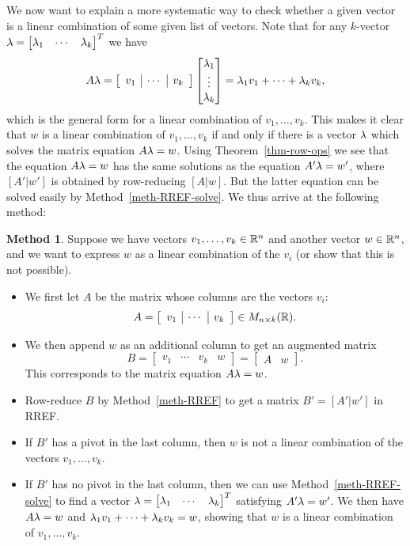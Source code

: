 \documentclass[reqno]{amsart}
\theoremstyle{definition}
\newtheorem{method}[theorem]{Method}
\begin{document}
We now want to explain a more systematic way to check whether a given
vector is a linear combination of some given list of vectors.
Note that for any $k$-vector
$\lambda=\left[\begin{matrix}\lambda_1 & \dotsb & \lambda_k\end{matrix}\right]^T$ we have
\[ A\lambda =
    \left[\begin{array}{c|c|c}
     v_1 & \cdots & v_k
    \end{array}\right]
    \left[\begin{matrix} \lambda_1 \\ \vdots \\ \lambda_k \end{matrix}\right] =
    \lambda_1 v_1 + \dotsb + \lambda_k v_k,
\]
which is the general form for a linear combination of
$v_1,\dotsc,v_k$.  This makes it clear that $w$ is a linear
combination of $v_1,\dotsc,v_k$ if and only if there is a vector $\lambda$
which solves the matrix equation $A\lambda=w$.  Using
Theorem~\ref{thm-row-ops} we see that the equation $A\lambda=w$ has the
same solutions as the equation $A'\lambda=w'$, where $[A' | w']$ is
obtained by row-reducing $[A | w]$.  But the latter equation
can be solved easily by Method~\ref{meth-RREF-solve}.  We thus arrive
at the following method: 

\begin{method}\label{meth-find-lincomb}
 Suppose we have vectors $v_1,\dotsc,v_k\in{\mathbb{R}}^n$ and another vector
 $w\in{\mathbb{R}}^n$, and we want to express $w$ as a linear combination of the
 $v_i$ (or show that this is not possible).
 \begin{itemize}
  \item[(a)] We first let $A$ be the matrix whose columns are the
   vectors $v_i$:
   \[ A = \left[\begin{array}{c|c|c}
       v_1 & \cdots & v_k
      \end{array}\right] \in M_{n\times k}({\mathbb{R}}).
   \]
  \item[(b)] We then append $w$ as an additional column to get an
   augmented matrix
   \[ B  = \left[\begin{array}{c|c|c|c}
       v_1 & \cdots & v_k & w
      \end{array}\right]
       = \left[\begin{array}{c|c} A & w\end{array}\right].
   \]
   This corresponds to the matrix equation $A\lambda=w$.
  \item[(c)] Row-reduce $B$ by Method~\ref{meth-RREF} to get a matrix
   $B'=[A'|w']$ in RREF.
  \item[(d)] If $B'$ has a pivot in the last column, then $w$ is not a
   linear combination of the vectors $v_1,\dotsc,v_k$.
  \item[(e)] If $B'$ has no pivot in the last column, then we can use
   Method~\ref{meth-RREF-solve} to find a vector
   $\lambda=\left[\begin{matrix}\lambda_1 & \cdots & \lambda_k\end{matrix}\right]^T$ satisfying $A'\lambda=w'$.  We
   then have $A\lambda=w$ and $\lambda_1v_1+\dotsb+\lambda_kv_k=w$, showing that
   $w$ is a linear combination of $v_1,\dotsc,v_k$.
 \end{itemize}
\end{method}
\end{document}
